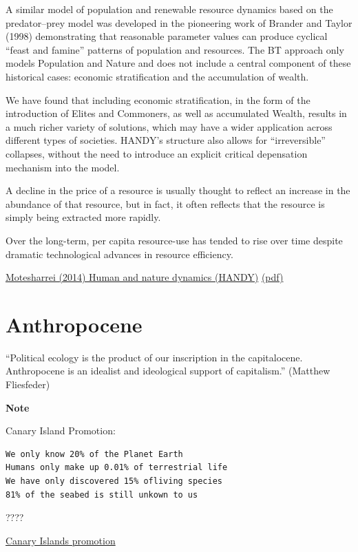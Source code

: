 \documentclass[
]{book}
\begin{document}
A similar model of population and renewable resource dynamics
based on the predator--prey model was developed in the pioneering
work of Brander and Taylor (1998) demonstrating that reasonable
parameter values can produce cyclical ``feast and famine'' patterns of
population and resources.
The BT approach only models Population and Nature and
does not include a central component of these historical cases: economic
stratification and the accumulation of wealth.

We have found that including economic
stratification, in the form of the introduction of Elites and Commoners,
as well as accumulated Wealth, results in a much richer variety of solutions,
which may have a wider application across different types of societies.
HANDY's structure also allows for ``irreversible'' collapses, without
the need to introduce an explicit critical depensation mechanism into
the model.

A decline in the
price of a resource is usually thought to reflect an increase in the
abundance of that resource, but in fact, it often reflects that the resource is
simply being extracted more rapidly.

Over the long-term, per capita resource-use has
tended to rise over time despite dramatic technological advances in
resource efficiency.

\href{https://www.sciencedirect.com/science/article/pii/S0921800914000615}{Motesharrei (2014) Human and nature dynamics (HANDY)}
\href{pdf/Motesharrei_2014_HANDY_Human_and_Nature_Dynamics.pdf}{(pdf)}

\hypertarget{anthropocene}{%
\chapter{Anthropocene}\label{anthropocene}}

``Political ecology is the product of our inscription in the capitalocene.
Anthropocene is an idealist and ideological support of capitalism.''
(Matthew Fliesfeder)

\textbf{Note}

Canary Island Promotion:

\begin{verbatim}
We only know 20% of the Planet Earth     
Humans only make up 0.01% of terrestrial life  
We have only discovered 15% ofliving species
81% of the seabed is still unkown to us
\end{verbatim}

????

\href{https://l.facebook.com/l.php?u=http\%3A\%2F\%2Fwww.hellocanaryislands.com\%2F\%3Ffbclid\%3DIwAR0KpL92zBE9DSFFBBlR3nUzvBiOeg8A-GavXdo7iG3FkfXs-qQJkzABYSM\&h=AT1b3VHRAPNbUMsETBii684uDQXiUvMGYAb5RKmfj1-SBxcHO-WGcEUt0cMBKL-6pyGiar4PybInjdaW7O0uy9zyVKsxJvjDmeHz1S7mYi78gtfsKSbXok8nzY0\&__tn__=\%2Cd-UC\%2CP-R\&c\%5B0\%5D=AT08xUEPHg6AG1h8CijMYsvQsAewR1efrP3cTARQlOlbbp1OjjOS7l5EEWN56QpEr43eZMYLpDdxhfjtxcRvHu6q_-C91aQ5RmmiqVUDwPFBn4dyozTyAWj8qB_XR8d3SnApk8jDSA3i_XUfVH9WN1jKbjfjnlou5zK5C5yo0mjfWWyz9kt0JQMtww}{Canary Islands promotion}
\end{document}
